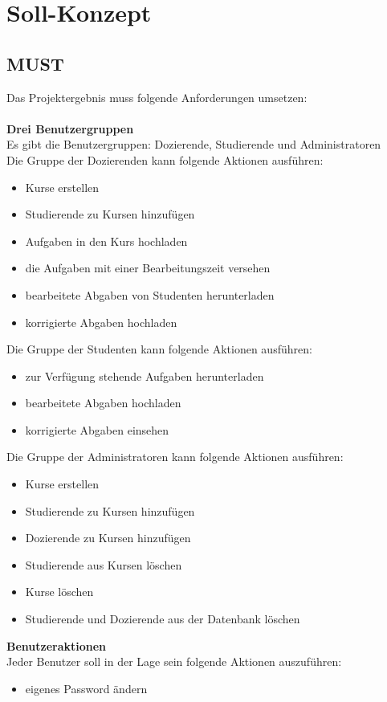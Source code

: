 
\chapter{Soll-Konzept}
\section{MUST}
Das Projektergebnis muss folgende Anforderungen umsetzen: \\ \\
\textbf{Drei Benutzergruppen} \\
Es gibt die Benutzergruppen: Dozierende, Studierende und Administratoren \\
Die Gruppe der Dozierenden kann folgende Aktionen ausführen: 
\begin{itemize}
\item Kurse erstellen
\item Studierende zu Kursen hinzufügen 
\item Aufgaben in den Kurs hochladen
\item die Aufgaben mit einer Bearbeitungszeit versehen
\item bearbeitete Abgaben von Studenten herunterladen
\item korrigierte Abgaben hochladen
\end{itemize}
Die Gruppe der Studenten kann folgende Aktionen ausführen:
\begin{itemize}
\item zur Verfügung stehende Aufgaben herunterladen
\item bearbeitete Abgaben hochladen
\item korrigierte Abgaben einsehen
\end{itemize}
Die Gruppe der Administratoren kann folgende Aktionen ausführen:
\begin{itemize}
\item Kurse erstellen
\item Studierende zu Kursen hinzufügen
\item Dozierende zu Kursen hinzufügen
\item Studierende aus Kursen löschen
\item Kurse löschen
\item Studierende und Dozierende aus der Datenbank löschen
\end{itemize}

\textbf{Benutzeraktionen} \\
Jeder Benutzer soll in der Lage sein folgende Aktionen auszuführen:
\begin{itemize}
\item eigenes Password ändern
\end{itemize}

